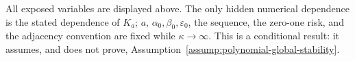 \begin{theorem}
All exposed variables are displayed above.  The only hidden
numerical dependence is the stated dependence of \(K_a\); \(a\),
\(\alpha_0,\beta_0,\varepsilon_0\), the sequence, the zero-one risk,
and the adjacency convention are fixed while \(\kappa\to\infty\).
This is a conditional result: it assumes, and does not prove,
Assumption~\ref{assump:polynomial-global-stability}.
\end{theorem}
